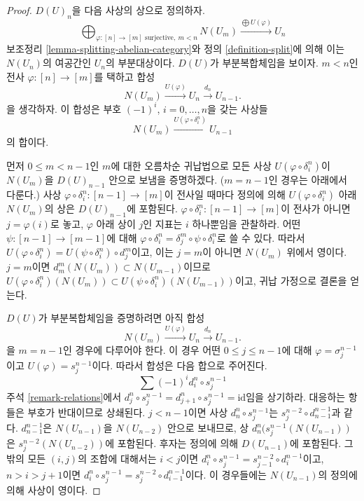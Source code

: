 \begin{proof}
$D(U)_n$을 다음 사상의 상으로 정의하자.
$$
\bigoplus\nolimits_{\varphi : [n] \to [m]\text{ surjective}, \ m < n} N(U_m)
\xrightarrow{\bigoplus U(\varphi)}
U_n
$$
보조정리 \ref{lemma-splitting-abelian-category}와 정의
\ref{definition-split}에 의해 이는 $N(U_n)$의 여공간인 $U_n$의
부분대상이다. $D(U)$가 부분복합체임을 보이자. $m < n$인 전사
$\varphi : [n] \to [m]$를 택하고 합성
$$
N(U_m) \xrightarrow{U(\varphi)} U_n \xrightarrow{d_n} U_{n - 1}.
$$
을 생각하자. 이 합성은 부호 $(-1)^i$, $i = 0, \ldots, n$을 갖는 사상들
$$
N(U_m) \xrightarrow{U(\varphi \circ \delta^n_i)} U_{n - 1}
$$
의 합이다.

\medskip\noindent
먼저 $0 \leq m < n - 1$인 $m$에 대한 오름차순 귀납법으로 모든 사상
$U(\varphi \circ \delta^n_i)$이 $N(U_m)$을 $D(U)_{n - 1}$ 안으로 보냄을
증명하겠다. ($m = n - 1$인 경우는 아래에서 다룬다.) 사상
$\varphi \circ \delta^n_i : [n - 1] \to [m]$이 전사일 때마다 정의에 의해
$U(\varphi \circ \delta^n_i)$ 아래 $N(U_m)$의 상은 $D(U)_{n - 1}$에
포함된다. $\varphi \circ \delta^n_i : [n - 1] \to [m]$이 전사가 아니면
$j = \varphi(i)$로 놓고, $\varphi$ 아래 상이 $j$인 지표는 $i$ 하나뿐임을
관찰하라.
어떤 $\psi : [n - 1] \to [m - 1]$에 대해
$\varphi \circ \delta^n_i = \delta^m_j \circ \psi \circ \delta^n_i$로
쓸 수 있다. 따라서
$U(\varphi \circ \delta^n_i) = U(\psi \circ \delta^n_i) \circ d^m_j$이고,
이는 $j = m$이 아니면 $N(U_m)$ 위에서 영이다. $j = m$이면
$d^m_m(N(U_m)) \subset N(U_{m - 1})$이므로
$U(\varphi \circ \delta^n_i)(N(U_m)) \subset
U(\psi \circ \delta^n_i)(N(U_{m - 1}))$이고, 귀납 가정으로 결론을 얻는다.

\medskip\noindent
$D(U)$가 부분복합체임을 증명하려면 아직 합성
$$
N(U_m) \xrightarrow{U(\varphi)} U_n \xrightarrow{d_n} U_{n - 1}.
$$
을 $m =  n - 1$인 경우에 다루어야 한다. 이 경우 어떤
$0 \leq j \leq n - 1$에 대해 $\varphi = \sigma^{n - 1}_j$이고
$U(\varphi) = s^{n - 1}_j$이다. 따라서 합성은 다음 합으로 주어진다.
$$
\sum (-1)^i d^n_i \circ s^{n - 1}_j
$$
주석 \ref{remark-relations}에서
$d^n_j \circ s^{n - 1}_j = d^n_{j + 1} \circ s^{n - 1}_j = \text{id}$임을
상기하라. 대응하는 항들은 부호가 반대이므로 상쇄된다. $j < n - 1$이면
사상 $d^n_n \circ s^{n - 1}_j$는
$s^{n - 2}_j \circ d^{n - 1}_{n - 1}$과 같다.
$d^{n - 1}_{n - 1}$은 $N(U_{n - 1})$을 $N(U_{n - 2})$ 안으로 보내므로,
상 $d^n_n ( s^{n - 1}_j (N(U_{n - 1}))$은
$s^{n - 2}_j(N(U_{n - 2}))$에 포함된다.
후자는 정의에 의해 $D(U_{n - 1})$에 포함된다. 그 밖의 모든
$(i, j)$의 조합에 대해서는 $i < j$이면
$d^n_i \circ s^{n - 1}_j = s^{n - 2}_{j - 1} \circ d^{n - 1}_i$이고,
$n > i > j + 1$이면
$d^n_i \circ s^{n - 1}_j = s^{n - 2}_j \circ d^{n - 1}_{i - 1}$이다.
이 경우들에는 $N(U_{n - 1})$의 정의에 의해 사상이 영이다.
\end{proof}

